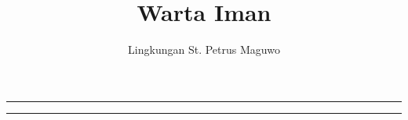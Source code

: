 \documentclass[a5paper,titlepage,11pt,openany]{scrbook}
\author{Lingkungan St. Petrus Maguwo}
\title{Warta Iman}
\begin{document}
\thispagestyle{empty}

\setlength{\parindent}{1cm}
\pagestyle{plain}
\begin{center}
\end{center}




%
\hrule

\hrule


\end{document}
